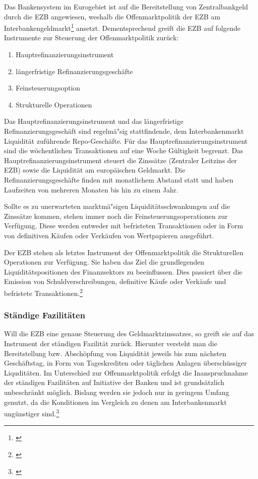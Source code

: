 \documentclass[
        onecolumn,
        a4paper,
        abstracton,
        parskip=half
        ,final
        ]{scrartcl}
\begin{document}
Das Bankensystem im Eurogebiet ist auf die Bereitstellung von Zentralbankgeld durch die EZB angewiesen, weshalb die Offenmarktpolitik der EZB am Interbankengeldmarkt\footnote[46]{\citep*[vgl.][S.558f]{Basseler2010}} ansetzt. Dementsprechend greift die EZB auf folgende Instrumente zur Steuerung der Offenmarktpolitik zur{\"u}ck:
\begin{enumerate}
 \item{Hauptrefinanzierungsinstrument}
 \item{l{\"a}ngerfristige Refinanzierungsgesch{\"a}fte}
 \item{Feinsteuerungsoption}
 \item{Strukturelle Operationen}
 \end{enumerate}

Das Hauptrefinanzierungsinstrument und das l{\"a}ngerfristige Refinanzierungsgesch{\"a}ft sind regelm{\"a}{"s}ig stattfindende, dem Interbankenmarkt Liquidit{\"a}t zuf{\"u}hrende Repo-Gesch{\"a}fte.
F{\"u}r das Hauptrefinanzierungsinstrument sind die w{\"o}chentlichen Transaktionen auf eine Woche G{\"u}ltigkeit begrenzt. Das Hauptrefinanzierungsinstrument steuert die Zinss{\"a}tze (Zentraler Leitzins der EZB) sowie die Liquidit{\"a}t am europ{\"a}ischen Geldmarkt. Die Refinanzierungsgesch{\"a}fte finden mit monatlichem Abstand statt und haben  Laufzeiten von mehreren Monaten bis hin zu einem Jahr.

Sollte es zu unerwarteten marktm{\"a}{"s}igen Liquidit{\"a}tsschwankungen auf die Zinss{\"a}tze kommen, stehen immer noch die Feinsteuerungsoperationen zur Verf{\"u}gung. Diese werden entweder mit befristeten Transaktionen oder in Form von definitiven  K{\"a}ufen oder Verk{\"a}ufen von Wertpapieren ausgef{\"u}hrt.

Der EZB stehen als letztes Instrument der Offenmarktpolitik die Strukturellen Operationen zur Verf{\"u}gung. Sie haben das Ziel die grundlegenden Liquidit{\"a}tspositionen des Finanzsektors zu beeinflussen. Dies passiert {\"u}ber die Emission von Schuldverschreibungen, definitive K{\"a}ufe oder Verk{\"a}ufe und befristete Transaktionen.\footnote[47]{\citep*[S.560]{Basseler2010}}

\subsubsection{St{\"a}ndige Fazilit{\"a}ten}  %

Will die EZB eine genaue Steuerung des Geldmarktzinssatzes, so greift sie auf das Instrument der st{\"a}ndigen Fazilit{\"a}t zur{\"u}ck. Hierunter versteht man die Bereitstellung bzw. Absch{\"o}pfung von Liquidit{\"a}t jeweils bis zum n{\"a}chsten Gesch{\"a}ftstag, in Form von Tageskrediten oder t{\"a}glichen Anlagen {\"u}bersch{\"u}ssiger Liqudit{\"a}ten. Im Unterschied zur Offenmarktpolitik erfolgt die Inanspruchnahme der st{\"a}ndigen Fazilit{\"a}ten auf Initiative der Banken und ist grunds{\"a}tzlich unbeschr{\"a}nkt m{\"o}glich. Bislang werden sie jedoch nur in geringem Umfang genutzt, da die Konditionen im Vergleich zu denen am Interbankenmarkt ung{\"u}nstiger sind.\footnote[48]{\citep*[vgl.][S.560ff]{Basseler2010}}
\end{document}
